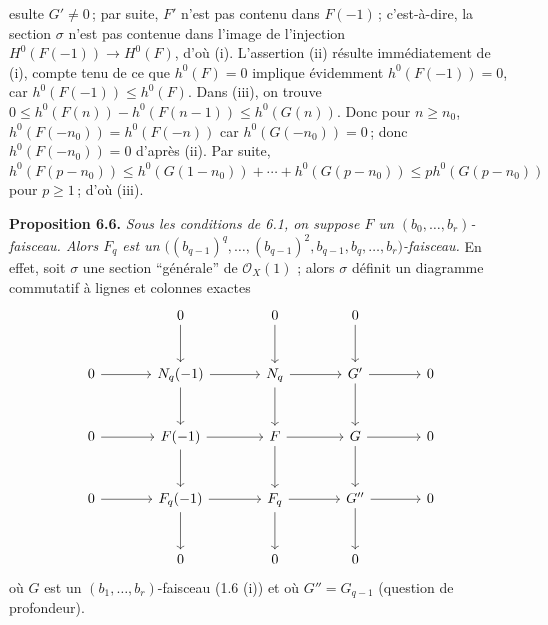 esulte $G'\ne0$\,; par suite, $F'$ n'est pas contenu dans $F(-1)$\,; c'est-\`a-dire, la section $\sigma$ n'est pas contenue dans l'image de l'injection $H^0(F(-1))\to H^0(F)$, d'o\`u (i). L'assertion (ii) r\'esulte imm\'ediatement de (i), compte tenu de ce que $h^0(F)=0$ implique \'evidemment $h^0(F(-1))=0$, car $h^0(F(-1))\le h^0(F)$. Dans (iii), on trouve $0\le h^0(F(n))-h^0(F(n-1))\le h^0(G(n))$. Donc pour $n\ge n_0$, $h^0(F(-n_0))=h^0(F(-n))$ car $h^0(G(-n_0))=0$\,; donc $h^0(F(-n_0))=0$ d'apr\`es (ii). Par suite, $h^0(F(p-n_0))\le h^0(G(1-n_0))+\cdots+h^0(G(p-n_0))\le ph^0(G(p-n_0))$ pour $p\ge1$\,; d'o\`u (iii).

\textbf{Proposition 6.6.} \emph{Sous les conditions de 6.1, on suppose $F$ un $(b_0,\ldots,b_r)$-faisceau. Alors $F_q$ est un $\bigl((b_{q-1})^q,\ldots,(b_{q-1})^2,b_{q-1},b_q,\ldots,b_r\bigr)$-faisceau.}
En effet, soit $\sigma$ une section ``g\'en\'erale'' de $\mathcal O_X(1)$ ; alors $\sigma$ d\'efinit un diagramme commutatif \`a lignes et colonnes exactes
\[
\begin{tikzcd}[column sep=large,row sep=large]
&0 \arrow[d]&0 \arrow[d]&0 \arrow[d]&\\
0 \arrow[r]&N_q(-1) \arrow[r] \arrow[d]&N_q \arrow[r] \arrow[d]&G' \arrow[r] \arrow[d]&0\\
0 \arrow[r]&F(-1) \arrow[r] \arrow[d]&F \arrow[r] \arrow[d]&G \arrow[r] \arrow[d]&0\\
0 \arrow[r]&F_q(-1) \arrow[r] \arrow[d]&F_q \arrow[r] \arrow[d]&G'' \arrow[r] \arrow[d]&0\\
&0&0&0&
\end{tikzcd}
\]
o\`u $G$ est un $(b_1,\ldots,b_r)$-faisceau (1.6 (i)) et o\`u $G''=G_{q-1}$ (question de profondeur).

